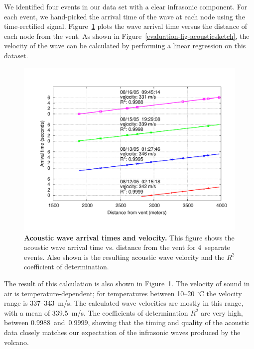 We identified four events in our data set with a clear infrasonic component.
For each event, we hand-picked the arrival time of the wave at each node
using the time-rectified signal. Figure~\ref{evaluation-fig-acousticarrival}
plots the wave arrival time versus the distance of each node from the vent.
As shown in Figure~\ref{evaluation-fig-acousticsketch}, the velocity of the
wave can be calculated by performing a linear regression on this dataset.

\clearpage

\begin{figure}[t]
\begin{center}
\includegraphics[width=\hsize]{./3-evaluation/figs/acousticarrival.pdf}
\end{center}

\caption{\textbf{Acoustic wave arrival times and velocity.} This figure shows
the acoustic wave arrival time vs. distance from the vent for 4~separate
events. Also shown is the resulting acoustic wave velocity and the $R^2$
coefficient of determination.}

\label{evaluation-fig-acousticarrival}
\end{figure}

The result of this calculation is also shown in
Figure~\ref{evaluation-fig-acousticarrival}. The velocity of sound in air is
temperature-dependent; for temperatures between 10--20 $^{\circ}$C the
velocity range is 337--343~m/s. The calculated wave velocities are mostly in
this range, with a mean of 339.5~m/s. The coefficients of determination $R^2$
are very high, between 0.9988~and~0.9999, showing that the timing and quality
of the acoustic data closely matches our expectation of the infrasonic waves
produced by the volcano.

